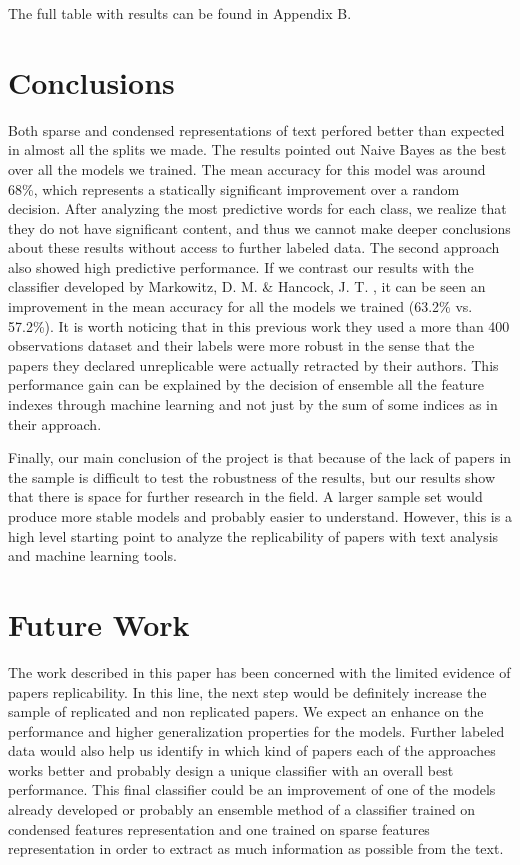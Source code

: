 \documentclass[12pt]{article}
\begin{document}
The full table with results can be found in Appendix B. 


\section{Conclusions}

Both sparse and condensed representations of text perfored better than expected in almost all the splits we made. The results pointed out Naive Bayes as the best over all the models we trained. The mean accuracy for this model was around 68\%, which represents a statically significant improvement over a random decision.  After analyzing the most predictive words for each class, we realize that they do not have significant content, and thus we cannot make deeper conclusions about these results without access to further labeled data.  
The second approach also showed high predictive performance. If we contrast our results with the classifier developed by Markowitz, D. M. \& Hancock, J. T. \cite{prev2}, it can be seen an improvement in the mean accuracy for all the models we trained (63.2\% vs. 57.2\%). It is worth noticing that in this previous work they used a more than 400 observations dataset and their labels were more robust in the sense that the papers they declared unreplicable were actually retracted by their authors. This performance gain can be explained by the decision of ensemble all the feature indexes through machine learning and not just by the sum of some indices as in their approach.

Finally, our main conclusion of the project is that because of the lack of papers in the sample is difficult to test the robustness of the results, but our results show that there is space for further research in the field. A larger sample set would produce more stable models and probably easier to understand. However, this is a high level starting point to analyze the replicability of papers with text analysis and machine learning tools.   


\section{Future Work}

The work described in this paper has been concerned with the limited evidence of papers replicability. In this line, the next step would be definitely increase the sample of replicated and non replicated papers. We expect an enhance on the performance and higher generalization properties for the models. Further labeled data would also help us identify in which kind of papers each of the approaches works better and probably design a unique classifier with an overall best performance. This final classifier could be an improvement of one of the models already developed or probably an ensemble method of a classifier trained on condensed features representation and one trained on sparse features representation in order to extract as much information as possible from the text. 
\end{document}
